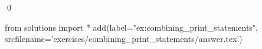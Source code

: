 
\begin{ex} 
  \label{ex:combining_print_statements}
  
  \qed
\end{ex} 
\begin{python0}
from solutions import *
add(label="ex:combining_print_statements",
    srcfilename='exercises/combining_print_statements/answer.tex') 
\end{python0}
